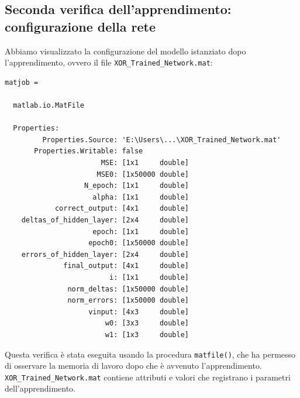 \documentclass[a4paper,12pt]{article}
\begin{document}
\subsection{Seconda verifica dell'apprendimento: configurazione della rete}

Abbiamo visualizzato la configurazione del modello istanziato dopo l’apprendimento, ovvero il file \texttt{XOR\_Trained\_Network.mat}:

\begin{lstlisting}[style=Matlab-editor]
matjob = 

  matlab.io.MatFile

  Properties:
         Properties.Source: 'E:\Users\...\XOR_Trained_Network.mat'
       Properties.Writable: false                                                                 
                       MSE: [1x1     double]                                                      
                      MSE0: [1x50000 double]                                                      
                   N_epoch: [1x1     double]                                                      
                     alpha: [1x1     double]                                                      
            correct_output: [4x1     double]                                                      
    deltas_of_hidden_layer: [2x4     double]                                                      
                     epoch: [1x1     double]                                                      
                    epoch0: [1x50000 double]                                                      
    errors_of_hidden_layer: [2x4     double]                                                      
              final_output: [4x1     double]                                                      
                         i: [1x1     double]                                                      
               norm_deltas: [1x50000 double]                                                      
               norm_errors: [1x50000 double]                                                      
                    vinput: [4x3     double]                                                      
                        w0: [3x3     double]                                                      
                        w1: [1x3     double] 
\end{lstlisting}

Questa verifica è stata eseguita usando la procedura \texttt{matfile()}, che ha permesso di osservare la memoria di lavoro dopo che è avvenuto l'apprendimento. \texttt{XOR\_Trained\_Network.mat} contiene attributi e valori che registrano i parametri dell'apprendimento.
\end{document}
